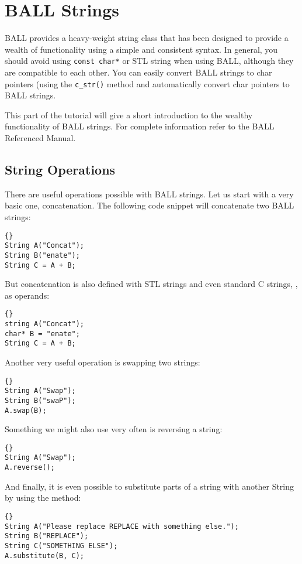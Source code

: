 \section{BALL Strings}

BALL provides a heavy-weight string class that has been designed
to provide a wealth of functionality using a simple and consistent syntax.
In general, you should avoid using {\tt const char*} or STL string when using
BALL, although they are compatible to each other. You can easily convert BALL
strings to char pointers (using the {\tt c\_str()} method and automatically
convert char pointers to BALL strings.

This part of the tutorial will give a short introduction to the wealthy
functionality of BALL strings. For complete information refer to the BALL
Referenced Manual.

\subsection{String Operations}

There are useful operations possible with BALL strings. Let us start with a
very basic one, concatenation. The following code snippet will concatenate two
BALL strings:
\begin{lstlisting}{}
String A("Concat");
String B("enate");
String C = A + B;
\end{lstlisting}
But concatenation is also defined with STL strings and even standard C
strings, , as operands:
\begin{lstlisting}{}
string A("Concat");
char* B = "enate";
String C = A + B;
\end{lstlisting}

\noindent
Another very useful operation is swapping two strings:
\begin{lstlisting}{}
String A("Swap");
String B("swaP");
A.swap(B);
\end{lstlisting}

\noindent
Something we might also use very often is reversing a string:
\begin{lstlisting}{}
String A("Swap");
A.reverse();
\end{lstlisting}

\noindent
And finally, it is even possible to substitute parts of a string with another
String by using the  method:
\begin{lstlisting}{}
String A("Please replace REPLACE with something else.");
String B("REPLACE");
String C("SOMETHING ELSE");
A.substitute(B, C);
\end{lstlisting}


